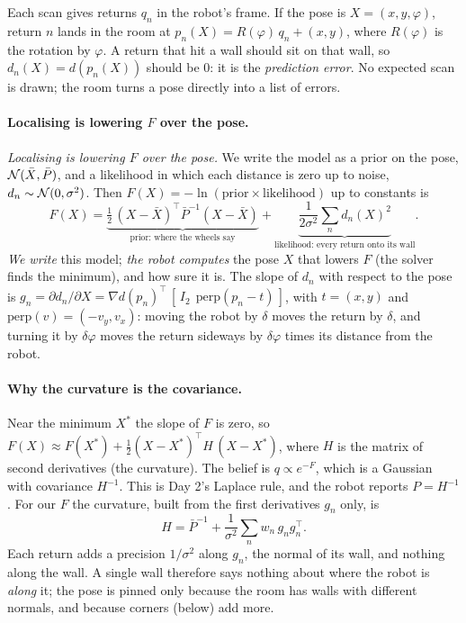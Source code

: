 \documentclass[11pt]{article}
\newcommand{\slt}[1]{\emph{#1}}   %
\begin{document}
Each scan gives returns $q_n$ in the robot's frame. If the pose is $X=(x,y,\varphi)$, return $n$ lands in the room at $p_n(X)=R(\varphi)\,q_n+(x,y)$, where $R(\varphi)$ is the rotation by $\varphi$. A return that hit a wall should sit on that wall, so $d_n(X)=d(p_n(X))$ should be 0: it is the \emph{prediction error}. No expected scan is drawn; the room turns a pose directly into a list of errors.

\paragraph{Localising is lowering $F$ over the pose.} \slt{Localising is lowering $F$ over the pose.} We write the model as a prior on the pose, $\mathcal{N}(\bar X,\bar P)$, and a likelihood in which each distance is zero up to noise, $d_n\sim\mathcal{N}(0,\sigma^2)$. Then $F(X)=-\ln(\text{prior}\times\text{likelihood})$ up to constants is
\[
F(X)=\underbrace{\tfrac12\,(X-\bar X)^\top\bar P^{-1}(X-\bar X)}_{\text{prior: where the wheels say}}+\underbrace{\frac1{2\sigma^2}\sum_n d_n(X)^2}_{\text{likelihood: every return onto its wall}} .
\]
\emph{We write} this model; \emph{the robot computes} the pose $X$ that lowers $F$ (the solver finds the minimum), and how sure it is. The slope of $d_n$ with respect to the pose is $g_n=\partial d_n/\partial X=\nabla d(p_n)^\top\,[\,I_2\ \ \mathrm{perp}(p_n-t)\,]$, with $t=(x,y)$ and $\mathrm{perp}(v)=(-v_y,v_x)$: moving the robot by $\delta$ moves the return by $\delta$, and turning it by $\delta\varphi$ moves the return sideways by $\delta\varphi$ times its distance from the robot.

\paragraph{Why the curvature is the covariance.} Near the minimum $X^\ast$ the slope of $F$ is zero, so $F(X)\approx F(X^\ast)+\tfrac12(X-X^\ast)^\top H\,(X-X^\ast)$, where $H$ is the matrix of second derivatives (the curvature). The belief is $q\propto e^{-F}$, which is a Gaussian with covariance $H^{-1}$. This is Day 2's Laplace rule, and the robot reports $P=H^{-1}$. For our $F$ the curvature, built from the first derivatives $g_n$ only, is
\[
H=\bar P^{-1}+\frac1{\sigma^2}\sum_n w_n\,g_ng_n^\top .
\]
Each return adds a precision $1/\sigma^2$ along $g_n$, the normal of its wall, and nothing along the wall. A single wall therefore says nothing about where the robot is \emph{along} it; the pose is pinned only because the room has walls with different normals, and because corners (below) add more.
\end{document}

